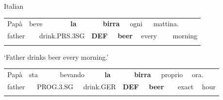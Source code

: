 \begin{listWWNumileveli}
\item 

\begin{styleExample}
\label{bkm:Ref173317986}Italian

\end{styleExample}

\end{listWWNumileveli}

\begin{listWWNumxliiileveli}
\item 

\end{listWWNumxliiileveli}

\begin{tabular}{llllllllllll}
\lsptoprule
Papà & \multicolumn{2}{l}{beve

} & \multicolumn{2}{l}{{\bfseries la}

} & \multicolumn{2}{l}{{\bfseries birra}

} & \multicolumn{2}{l}{ogni

} & \multicolumn{2}{l}{mattina.

} & \\
\multicolumn{2}{l}{father

} & \multicolumn{2}{l}{drink.PRS.3SG

} & \multicolumn{2}{l}{{\bfseries DEF}

} & \multicolumn{2}{l}{{\bfseries beer}

} & \multicolumn{2}{l}{every

} & \multicolumn{2}{l}{morning

}\\
\lspbottomrule
\end{tabular}

\begin{styleTranslation}
‘Father drinks beer every morning.’ 

\end{styleTranslation}

\begin{tabular}{llllllllllllll}
\lsptoprule
Papà & \multicolumn{2}{l}{sta

} & \multicolumn{2}{l}{bevando

} & \multicolumn{2}{l}{{\bfseries la}

} & \multicolumn{2}{l}{{\bfseries birra}

} & \multicolumn{2}{l}{proprio

} & \multicolumn{2}{l}{ora.

} & \\
\multicolumn{2}{l}{father

} & \multicolumn{2}{l}{PROG.3.SG

} & \multicolumn{2}{l}{drink.GER

} & \multicolumn{2}{l}{{\bfseries DEF}

} & \multicolumn{2}{l}{{\bfseries beer}

} & \multicolumn{2}{l}{exact

} & \multicolumn{2}{l}{hour

}\\
\lspbottomrule
\end{tabular}

